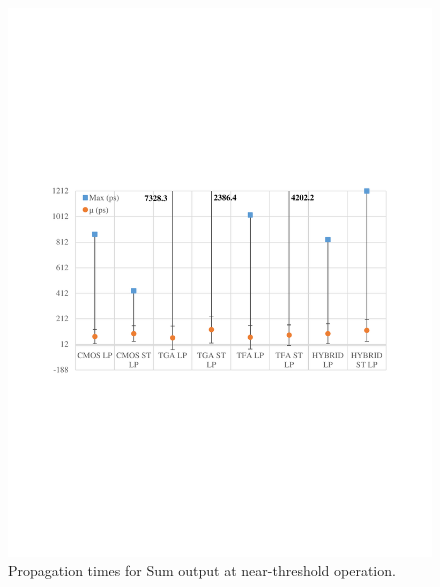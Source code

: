 \documentclass[ecp,tc, english]{iiufrgs}
\begin{document}
\begin{figure}[H]
\centering
\includegraphics[width=\textwidth, trim={0 9cm 0 9cm},clip]{delaysNTSum.pdf}
\caption{Propagation times for Sum output at near-threshold operation.}
\label{fig:Fig45}
\end{figure}
\end{document}
